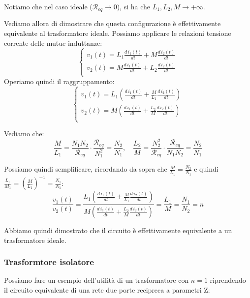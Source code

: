 \documentclass[a4paper,11pt]{article}
\begin{document}
Notiamo che nel caso ideale ($\mathcal{R}_{eq} \rightarrow 0$), si ha che $L_1, L_2, M \rightarrow + \infty$.

Vediamo allora di dimostrare che questa configurazione è effettivamente equivalente al trasformatore ideale.
Possiamo applicare le relazioni tensione corrente delle mutue induttanze:
$$
	\begin{cases}
		v_1(t) = L_1 \frac{d\,i_1(t)}{dt} + M \frac{d\, i_2(t)}{dt} \\ 	
		v_2(t) = M \frac{d\,i_1(t)}{dt} + L_2 \frac{d\, i_2(t)}{dt} \\ 	
	\end{cases}
$$
Operiamo quindi il raggruppamento:
$$
	\begin{cases}
		v_1(t) = L_1 \left( \frac{d\,i_1(t)}{dt} + \frac{M}{L_1} \frac{d\, i_2(t)}{dt} \right) \\ 	
		v_2(t) = M \left( \frac{d\,i_1(t)}{dt} + \frac{L_2}{M} \frac{d\, i_2(t)}{dt} \right) \\ 	
	\end{cases}
$$

Vediamo che:
$$
\frac{M}{L_1} = \frac{N_1 N_2}{\mathcal{R}_{eq}} \cdot \frac{\mathcal{R}_{eq}}{N_1^2} = \frac{N_2}{N_1}, \quad
\frac{L_2}{M} = \frac{N_2^2}{\mathcal{R}_{eq}} \cdot \frac{\mathcal{R}_{eq}}{N_1 N_2} = \frac{N_2}{N_1}
$$

Possiamo quindi semplificare, ricordando da sopra che  $\frac{M}{L_1} = \frac{N_2}{N_1}$ e quindi $\frac{L_1}{M_1} = \left( \frac{M}{L_1} \right)^{-1} = \frac{N_1}{N_1}$:
$$
\frac{v_1(t)}{v_2(t)} = \frac{ L_1 \left( \frac{d\,i_1(t)}{dt} + \frac{M}{L_1} \frac{d\, i_2(t)}{dt} \right)}{ M \left( \frac{d\,i_1(t)}{dt} + \frac{L_2}{M} \frac{d\, i_2(t)}{dt} \right)} = \frac{L_1}{M} = \frac{N_1}{N_2} = n
$$

Abbiamo quindi dimostrato che il circuito è effettivamente equivalente a un trasformatore ideale.

\subsubsection{Trasformtore isolatore}
Possiamo fare un esempio dell'utilità di un trasformatore con $n=1$ riprendendo il circuito equivalente di una rete due porte recipreca a parametri Z:
\end{document}
